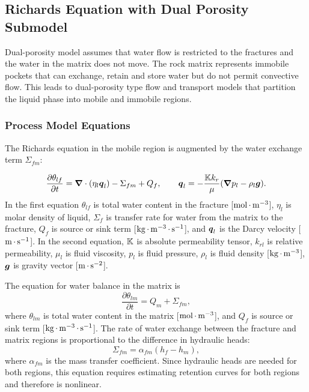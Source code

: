 
\subsection{Richards Equation with Dual Porosity Submodel}
\label{sec:dual-porosity-richards-equation}

Dual-porosity model assumes that water flow is restricted to the fractures and the
water in the matrix does not move.
The rock matrix represents immobile pockets that can exchange, retain and store water
but do not permit convective flow.
This leads to dual-porosity type flow and transport models that partition the liquid
phase into mobile and immobile regions.


\subsubsection{Process Model Equations} 
\label{sec:sual-porosity-richards-model-equations}

The Richards equation in the mobile region is augmented by the water exchange
term $\Sigma_{fm}$: 

\begin{equation}
  \frac{\partial \theta_{lf}}{\partial t} 
  = {\boldsymbol{\nabla}} \cdot (\eta_l {\boldsymbol{q}}_l) - \Sigma_{fm} + Q_f,
  \qquad
  {\boldsymbol{q}}_l = -\frac{{\mathbb K} k_r}{\mu} ({\boldsymbol{\nabla}} p_l - \rho_l {\boldsymbol{g}}).
\end{equation}
In the first equation $\theta_{lf}$ is total water content in the fracture [${\rm mol}{\,\cdot\,}{\rm m}^{-3}$],
$\eta_l$ is molar density of liquid,
$\Sigma_f$ is transfer rate for water from the matrix to the fracture, 
$Q_f$ is source or sink term [${\rm kg} {\,\cdot\,} {\rm m}^{-3} {\,\cdot\,} {\rm s}^{-1}$],
and ${\boldsymbol{q}}_l$ is the Darcy velocity [${\rm m} {\,\cdot\,} {\rm s}^{-1}$].
In the second equation,
${\mathbb K}$ is absolute permeability tensor,
$k_{rl}$ is relative permeability,
$\mu_l$ is fluid viscosity,
$p_l$ is fluid pressure,
$\rho_l$ is fluid density [${\rm kg} {\,\cdot\,} {\rm m}^{-3}$],
${\boldsymbol{g}}$ is gravity vector [${\rm m} {\,\cdot\,} {\rm s}^{-2}$].

The equation for water balance in the matrix is
$$
  \frac{\partial \theta_{lm}}{\partial t} 
  = Q_m + \Sigma_{fm},
$$
where 
$\theta_{lm}$ is total water content in the matrix [${\rm mol}{\,\cdot\,}{\rm m}^{-3}$],
and $Q_f$ is source or sink term [${\rm kg} {\,\cdot\,} {\rm m}^{-3} {\,\cdot\,} {\rm s}^{-1}$].
The rate of water exchange between the fracture and matrix regions is
proportional to the difference in hydraulic heads:
$$
  \Sigma_{fm} = \alpha_{fm} (h_f - h_m),
$$
where $\alpha_{fm}$ is the mass transfer coefficient.
Since hydraulic heads are needed for both regions, this equation requires
estimating retention curves for both regions and therefore is nonlinear.



